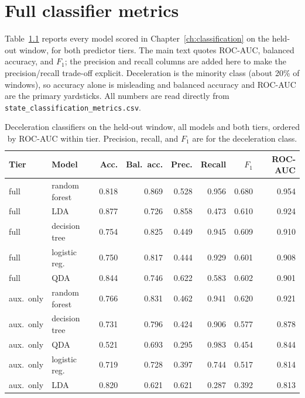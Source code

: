 \chapter{Full classifier metrics}
\label{app:clfmetrics}

Table~\ref{tab:clfmetrics} reports every model scored in Chapter~\ref{ch:classification} on
the held-out window, for both predictor tiers. The main text quotes ROC-AUC, balanced
accuracy, and $F_1$; the precision and recall columns are added here to make the
precision/recall trade-off explicit. Deceleration is the minority class (about 20\% of
windows), so accuracy alone is misleading and balanced accuracy and ROC-AUC are the primary
yardsticks. All numbers are read directly from
\texttt{state\_classification\_metrics.csv}.

\begin{table}[htbp]
  \centering
  \caption{Deceleration classifiers on the held-out window, all models and both tiers,
  ordered by ROC-AUC within tier. Precision, recall, and $F_1$ are for the deceleration
  class.}
  \label{tab:clfmetrics}
  \begin{tabular}{llrrrrrr}
    \toprule
    Tier & Model & Acc. & Bal.\ acc. & Prec. & Recall & $F_1$ & ROC-AUC \\
    \midrule
    full & random forest      & 0.818 & 0.869 & 0.528 & 0.956 & 0.680 & 0.954 \\
    full & LDA                & 0.877 & 0.726 & 0.858 & 0.473 & 0.610 & 0.924 \\
    full & decision tree      & 0.754 & 0.825 & 0.449 & 0.945 & 0.609 & 0.910 \\
    full & logistic reg.      & 0.750 & 0.817 & 0.444 & 0.929 & 0.601 & 0.908 \\
    full & QDA                & 0.844 & 0.746 & 0.622 & 0.583 & 0.602 & 0.901 \\
    \midrule
    aux.\ only & random forest & 0.766 & 0.831 & 0.462 & 0.941 & 0.620 & 0.921 \\
    aux.\ only & decision tree & 0.731 & 0.796 & 0.424 & 0.906 & 0.577 & 0.878 \\
    aux.\ only & QDA           & 0.521 & 0.693 & 0.295 & 0.983 & 0.454 & 0.844 \\
    aux.\ only & logistic reg. & 0.719 & 0.728 & 0.397 & 0.744 & 0.517 & 0.814 \\
    aux.\ only & LDA           & 0.820 & 0.621 & 0.621 & 0.287 & 0.392 & 0.813 \\
    \bottomrule
  \end{tabular}
\end{table}
